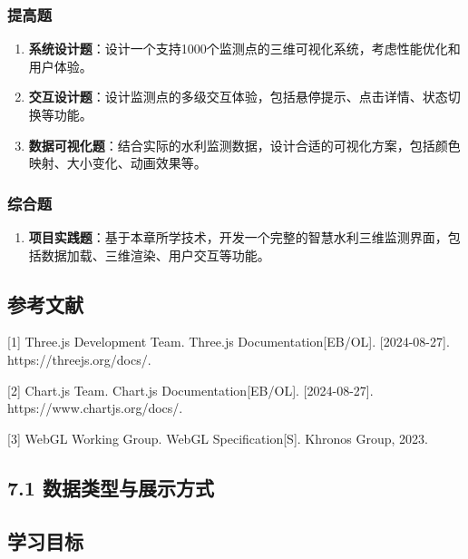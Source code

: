 \subsubsection{提高题}\label{ux63d0ux9ad8ux9898}

\begin{enumerate}
\def\labelenumi{\arabic{enumi}.}
\setcounter{enumi}{3}
\item
  \textbf{系统设计题}：设计一个支持1000个监测点的三维可视化系统，考虑性能优化和用户体验。
\item
  \textbf{交互设计题}：设计监测点的多级交互体验，包括悬停提示、点击详情、状态切换等功能。
\item
  \textbf{数据可视化题}：结合实际的水利监测数据，设计合适的可视化方案，包括颜色映射、大小变化、动画效果等。
\end{enumerate}

\subsubsection{综合题}\label{ux7efcux5408ux9898}

\begin{enumerate}
\def\labelenumi{\arabic{enumi}.}
\setcounter{enumi}{6}
\tightlist
\item
  \textbf{项目实践题}：基于本章所学技术，开发一个完整的智慧水利三维监测界面，包括数据加载、三维渲染、用户交互等功能。
\end{enumerate}

\subsection{参考文献}\label{ux53c2ux8003ux6587ux732e}

{[}1{]} Three.js Development Team. Three.js Documentation{[}EB/OL{]}. {[}2024-08-27{]}. https://threejs.org/docs/.

{[}2{]} Chart.js Team. Chart.js Documentation{[}EB/OL{]}. {[}2024-08-27{]}. https://www.chartjs.org/docs/.

{[}3{]} WebGL Working Group. WebGL Specification{[}S{]}. Khronos Group, 2023.

\subsection{7.1 数据类型与展示方式}\label{ux6570ux636eux7c7bux578bux4e0eux5c55ux793aux65b9ux5f0f}

\subsection{学习目标}\label{ux5b66ux4e60ux76eeux6807-1}

